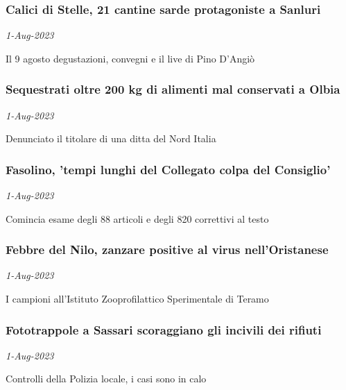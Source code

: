 \subsubsection{Calici di Stelle, 21 cantine sarde protagoniste a Sanluri \href{https://www.ansa.it/sardegna/notizie/2023/08/01/calici-di-stelle-21-cantine-sarde-protagoniste-a-sanluri_cfd82552-c47e-4165-b10b-e75b0be3aa11.html}{}}
\textit{1-Aug-2023}

Il 9 agosto degustazioni, convegni e il live di Pino D'Angi\`{o}
\subsubsection{Sequestrati oltre 200 kg di alimenti mal conservati a Olbia \href{https://www.ansa.it/sardegna/notizie/2023/08/01/sequestrati-oltre-200-kg-di-alimenti-mal-conservati-a-olbia_2aea1f69-53fb-4ec6-b153-779f7479f9f9.html}{}}
\textit{1-Aug-2023}

Denunciato il titolare di una ditta del Nord Italia
\subsubsection{Fasolino, 'tempi lunghi del Collegato colpa del Consiglio' \href{https://www.ansa.it/sardegna/notizie/2023/08/01/fasolino-tempi-lunghi-del-collegato-colpa-del-consiglio_1b8b8bf0-e364-4cc2-87f3-f42a255a6511.html}{}}
\textit{1-Aug-2023}

Comincia esame degli 88 articoli e degli 820 correttivi al testo
\subsubsection{Febbre del Nilo, zanzare positive al virus nell'Oristanese \href{https://www.ansa.it/sardegna/notizie/2023/08/01/febbre-del-nilo-zanzare-positive-al-virus-nelloristanese_535501c8-c8b7-4483-af1c-caf4256da719.html}{}}
\textit{1-Aug-2023}

I campioni all'Istituto Zooprofilattico Sperimentale di Teramo
\subsubsection{Fototrappole a Sassari scoraggiano gli incivili dei rifiuti \href{https://www.ansa.it/sardegna/notizie/2023/08/01/fototrappole-a-sassari-scoraggiano-gli-incivili-dei-rifiuti_a6be9a5c-149b-4457-876b-0a216d9c4d24.html}{}}
\textit{1-Aug-2023}

Controlli della Polizia locale, i casi sono in calo
